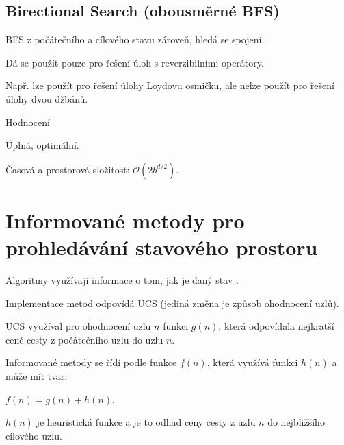 \subsection{Birectional Search (obousměrné BFS)}

\begin{compactitem}
    \item BFS z počátečního a cílového stavu zároveň, hledá se spojení.
    \item Dá se použít pouze pro řešení úloh s reverzibilními operátory.
    \begin{compactitem}
        \item Např. lze použít pro řešení úlohy Loydovu osmičku, ale nelze použít pro řešení úlohy dvou džbánů.
    \end{compactitem}

    \item Hodnocení \begin{compactitem}
        \item Úplná, optimální.
        \item Časová a prostorová složitost: $\mathcal{O}(2b^{d / 2})$.
    \end{compactitem}
\end{compactitem}


\section{Informované metody pro prohledávání stavového prostoru}

\begin{compactitem}
    \item Algoritmy využívají informace o tom, jak je daný stav .
    \item Implementace metod odpovídá UCS (jediná změna je způsob ohodnocení uzlů).
    \item UCS využíval pro ohodnocení uzlu $n$ funkci $g(n)$, která odpovídala nejkratší ceně cesty z počátečního uzlu do uzlu $n$.
    \item Informované metody se řídí podle funkce $f(n)$, která využívá funkci $h(n)$ a může mít tvar: \begin{compactitem}
        \item $f(n) = g(n) + h(n)$,
        \item $h(n)$ je heuristická funkce a je to odhad ceny cesty z uzlu $n$ do nejbližšího cílového uzlu.
    \end{compactitem}
\end{compactitem}


